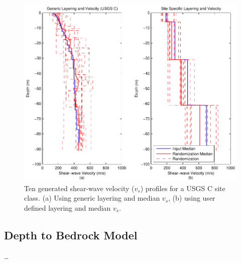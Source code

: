 \documentclass[12pt,oneside]{book}
\begin{document}
\begin{figure}[tbp]
    \begin{center}
        \includegraphics[width=\linewidth]{figures/rand/profile.pdf}
    \end{center}
    \caption{Ten generated shear-wave velocity ($v_s$) profiles for a USGS C site class. (a) Using
    generic layering and median $v_s$, (b) using user defined layering and median $v_s$.}
    \label{fig:rand:vsProfile}
\end{figure}
\clearpage

\subsection{Depth to Bedrock Model}
\ldots
\end{document}
